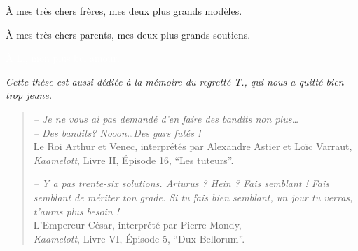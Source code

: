 
\begin{dedication}

    À mes très chers frères, mes deux plus grands modèles.

    À mes très chers parents, mes deux plus grands soutiens.

    \textcolor{white}{À L., mon plus bel amour.}

    \vfill{}

    \emph{Cette thèse est aussi dédiée à la mémoire du regretté T., qui nous a quitté bien trop jeune.}

    \vfill{}

    \hr{}


    \begin{small}
    \begin{quote}
        \emph{-- Je ne vous ai pas demandé d'en faire des \emph{bandits} non plus\dots}\\
        \emph{-- Des \emph{bandits}? Nooon\dots Des gars futés !}\\
        Le Roi Arthur et Venec,
        interprétés par Alexandre Astier et Loïc Varraut,\\
        \emph{Kaamelott}, Livre II, Épisode 16, ``Les tuteurs''.



    \vspace*{10pt}

        \emph{
            -- Y a pas trente-six solutions.
            Arturus ? Hein ? Fais semblant !
            Fais semblant de mériter ton grade.
            Si tu fais bien semblant, un jour tu verras, t'auras plus besoin !
        }\\
        L'Empereur César, interprété par Pierre Mondy,\\
        \emph{Kaamelott}, Livre VI, Épisode 5, ``Dux Bellorum''.


\end{quote}
\end{small}
\end{dedication}
